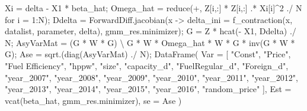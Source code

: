 \documentclass[
  letterpaper,
  DIV=11,
  numbers=noendperiod]{scrreprt}
\newenvironment{Shaded}{\begin{snugshade}}{\end{snugshade}}
\newcommand{\CharTok}[1]{\textcolor[rgb]{0.13,0.47,0.30}{#1}}
\newcommand{\FunctionTok}[1]{\textcolor[rgb]{0.28,0.35,0.67}{#1}}
\newcommand{\NormalTok}[1]{\textcolor[rgb]{0.00,0.23,0.31}{#1}}
\newcommand{\OperatorTok}[1]{\textcolor[rgb]{0.37,0.37,0.37}{#1}}
\newcommand{\StringTok}[1]{\textcolor[rgb]{0.13,0.47,0.30}{#1}}
\begin{document}
\begin{Shaded}
\begin{Highlighting}[]
\NormalTok{Xi }\OperatorTok{=}\NormalTok{ delta }\OperatorTok{{-}}\NormalTok{ X1 }\OperatorTok{*}\NormalTok{ beta\_hat;}
\NormalTok{Omega\_hat }\OperatorTok{=} \FunctionTok{reduce}\NormalTok{(}\OperatorTok{+}\NormalTok{, Z[i,}\OperatorTok{:}\NormalTok{] }\OperatorTok{*}\NormalTok{ Z[i,}\OperatorTok{:}\NormalTok{]}\CharTok{\textquotesingle{} .* Xi[i]\^{}2 ./ N for i = 1:N);}
\NormalTok{Ddelta }\OperatorTok{=}\NormalTok{ ForwardDiff.}\FunctionTok{jacobian}\NormalTok{(x }\OperatorTok{{-}\textgreater{}}\NormalTok{ delta\_ini }\OperatorTok{=} \FunctionTok{f\_contraction}\NormalTok{(x, datalist, parameter, delta), gmm\_res.minimizer);}
\NormalTok{G }\OperatorTok{=}\NormalTok{ Z}\OperatorTok{\textquotesingle{}} \OperatorTok{*} \FunctionTok{hcat}\NormalTok{(}\OperatorTok{{-}}\NormalTok{ X1, Ddelta) }\OperatorTok{./}\NormalTok{ N;}
\NormalTok{AsyVarMat }\OperatorTok{=}\NormalTok{ (G}\OperatorTok{\textquotesingle{}} \OperatorTok{*}\NormalTok{ W }\OperatorTok{*}\NormalTok{ G) }\OperatorTok{\textbackslash{}}\NormalTok{ G}\OperatorTok{\textquotesingle{}} \OperatorTok{*}\NormalTok{ W }\OperatorTok{*}\NormalTok{ Omega\_hat }\OperatorTok{*}\NormalTok{ W }\OperatorTok{*}\NormalTok{ G }\OperatorTok{*} \FunctionTok{inv}\NormalTok{(G}\OperatorTok{\textquotesingle{}} \OperatorTok{*}\NormalTok{ W }\OperatorTok{*}\NormalTok{ G);}
\NormalTok{Ase }\OperatorTok{=} \FunctionTok{sqrt}\NormalTok{.(}\FunctionTok{diag}\NormalTok{(AsyVarMat) }\OperatorTok{./}\NormalTok{ N);}
\FunctionTok{DataFrame}\NormalTok{(}
\NormalTok{    Var }\OperatorTok{=}\NormalTok{ [}
        \StringTok{"Const"}\NormalTok{, }\StringTok{"Price"}\NormalTok{, }\StringTok{"Fuel Efficiency"}\NormalTok{, }\StringTok{"hppw"}\NormalTok{, }\StringTok{"size"}\NormalTok{, }
        \StringTok{"capacity\_d"}\NormalTok{, }\StringTok{"FuelRegular\_d"}\NormalTok{, }\StringTok{"Foreign\_d"}\NormalTok{,}
        \StringTok{"year\_2007"}\NormalTok{, }\StringTok{"year\_2008"}\NormalTok{, }\StringTok{"year\_2009"}\NormalTok{, }
        \StringTok{"year\_2010"}\NormalTok{, }\StringTok{"year\_2011"}\NormalTok{, }\StringTok{"year\_2012"}\NormalTok{, }
        \StringTok{"year\_2013"}\NormalTok{, }\StringTok{"year\_2014"}\NormalTok{, }\StringTok{"year\_2015"}\NormalTok{, }\StringTok{"year\_2016"}\NormalTok{, }
        \StringTok{"random\_price"}
\NormalTok{        ],}
\NormalTok{    Est }\OperatorTok{=} \FunctionTok{vcat}\NormalTok{(beta\_hat, gmm\_res.minimizer),}
\NormalTok{    se }\OperatorTok{=}\NormalTok{ Ase}
\NormalTok{)}
\end{Highlighting}
\end{Shaded}
\end{document}
